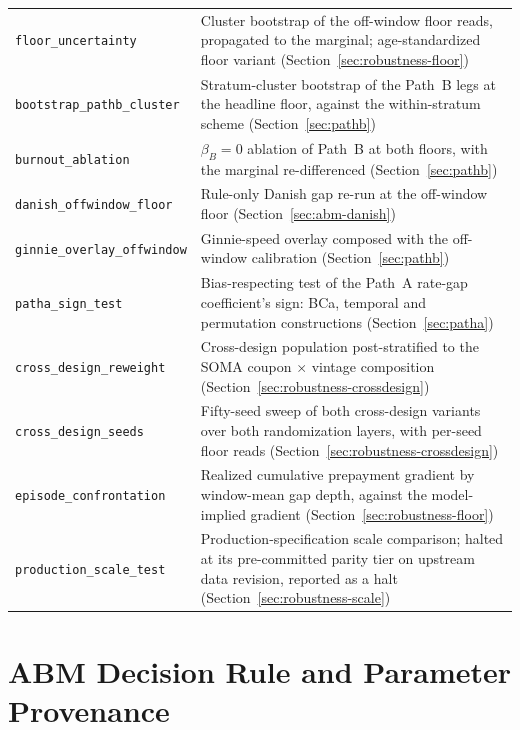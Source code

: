 \documentclass[12pt]{article}
\begin{document}
\begin{table}[H]
\begin{threeparttable}
\begin{tabular}{@{}p{5.4cm}p{8.8cm}@{}}
\texttt{floor\_uncertainty} & Cluster bootstrap of the off-window floor reads, propagated to the marginal; age-standardized floor variant (Section~\ref{sec:robustness-floor}) \\
\texttt{bootstrap\_pathb\_cluster} & Stratum-cluster bootstrap of the Path~B legs at the headline floor, against the within-stratum scheme (Section~\ref{sec:pathb}) \\
\texttt{burnout\_ablation} & $\beta_B = 0$ ablation of Path~B at both floors, with the marginal re-differenced (Section~\ref{sec:pathb}) \\
\texttt{danish\_offwindow\_floor} & Rule-only Danish gap re-run at the off-window floor (Section~\ref{sec:abm-danish}) \\
\texttt{ginnie\_overlay\_offwindow} & Ginnie-speed overlay composed with the off-window calibration (Section~\ref{sec:pathb}) \\
\texttt{patha\_sign\_test} & Bias-respecting test of the Path~A rate-gap coefficient's sign: BCa, temporal and permutation constructions (Section~\ref{sec:patha}) \\
\texttt{cross\_design\_reweight} & Cross-design population post-stratified to the SOMA coupon $\times$ vintage composition (Section~\ref{sec:robustness-crossdesign}) \\
\texttt{cross\_design\_seeds} & Fifty-seed sweep of both cross-design variants over both randomization layers, with per-seed floor reads (Section~\ref{sec:robustness-crossdesign}) \\
\texttt{episode\_confrontation} & Realized cumulative prepayment gradient by window-mean gap depth, against the model-implied gradient (Section~\ref{sec:robustness-floor}) \\
\texttt{production\_scale\_test} & Production-specification scale comparison; halted at its pre-committed parity tier on upstream data revision, reported as a halt (Section~\ref{sec:robustness-scale}) \\
\bottomrule
\end{tabular}
\end{threeparttable}
\end{table}

\section{ABM Decision Rule and Parameter Provenance}\label{app:abmspec}
\end{document}
